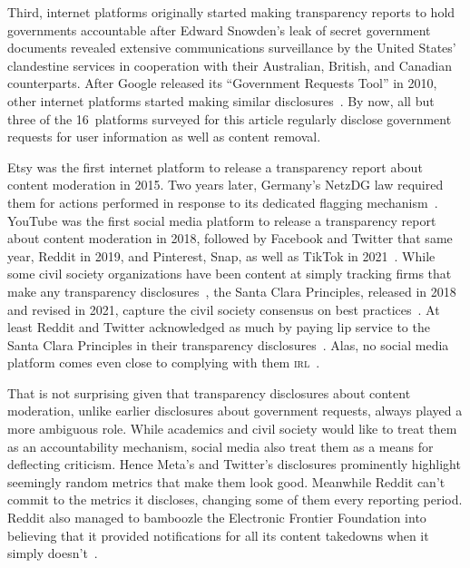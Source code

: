 \documentclass[nonacm,screen]{acmart}
\newcommand\V[1]{\textsc{\MakeLowercase{#1}}}
\begin{document}
\begin{itemize}
{Third, internet platforms originally started making transparency reports to hold
governments accountable after Edward Snowden's leak of secret government
documents revealed extensive communications surveillance by the United States'
clandestine services in cooperation with their Australian, British, and Canadian
counterparts. After Google released its ``Government Requests Tool'' in 2010,
other internet platforms started making similar
disclosures~\cite{TrustSafetyProfessionalAssociation2022}. By now, all but three
of the 16~platforms surveyed for this article regularly disclose government
requests for user information as well as content removal.

Etsy was the first internet platform to release a transparency report about
content moderation in 2015. Two years later, Germany's NetzDG law required them
for actions performed in response to its dedicated flagging
mechanism~\cite{TrustSafetyProfessionalAssociation2022}. YouTube was the first
social media platform to release a transparency report about content moderation
in 2018, followed by Facebook and Twitter that same year, Reddit in 2019, and
Pinterest, Snap, as well as TikTok in 2021~\cite{Binder2018,York2018}. While
some civil society organizations have been content at simply tracking firms that
make any transparency disclosures~\cite{AccessNow2021,StoughtonRosenzweig2022},
the Santa Clara Principles, released in 2018 and revised in 2021, capture the
civil society consensus on best
practices~\cite{AccessNowACLUFoundationOfNorthernCaliforniaea2021}. At least
Reddit and Twitter acknowledged as much by paying lip service to the Santa Clara
Principles in their transparency disclosures~\cite{Reddit2022,Twitter2022}.
Alas, no social media platform comes even close to complying with them
\V{IRL}~\cite{UrmanMakhortykh2023}.

That is not surprising given that transparency disclosures about content
moderation, unlike earlier disclosures about government requests, always played
a more ambiguous role. While academics and civil society would like to treat
them as an accountability mechanism, social media also treat them as a means for
deflecting criticism. Hence Meta's and Twitter's disclosures prominently
highlight seemingly random metrics that make them look good. Meanwhile Reddit
can't commit to the metrics it discloses, changing some of them every reporting
period. Reddit also managed to bamboozle the Electronic Frontier Foundation into
believing that it provided notifications for all its content takedowns when it
simply doesn't~\cite{CrockerGebhartea2019,Hawkins2023}.

}
\end{itemize}
\end{document}

